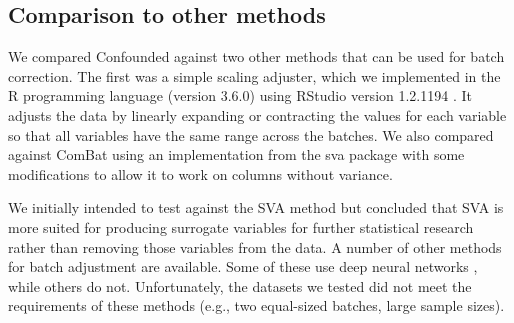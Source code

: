 \subsection{Comparison to other methods}

We compared Confounded against two other methods that can be used for batch correction. The first was a simple scaling adjuster,
which we implemented in the R programming language (version 3.6.0) \citep{r_core_team_r_2014} using RStudio version 1.2.1194 \citep{rstudio_team_rstudio_2018}.
It adjusts the data by linearly expanding or contracting the values for each variable so that all variables have the same range across the batches.
We also compared against ComBat \citep{johnson_adjusting_2007} using an implementation from the sva package \citep{leek_sva_2017} with some modifications to allow it to work on columns without variance.

We initially intended to test against the SVA \citep{leek_capturing_2007} method but concluded that SVA is more suited for producing surrogate variables for further statistical research rather than removing those variables from the data.
A number of other methods for batch adjustment are available. Some of these use deep neural networks \citep{shaham_removal_2017,shaham_batch_2018,upadhyay_removal_2019}, while others do not\citep{espin-perez_comparison_2018}.
Unfortunately, the datasets we tested did not meet the requirements of these methods (e.g., two equal-sized batches, large sample sizes).

